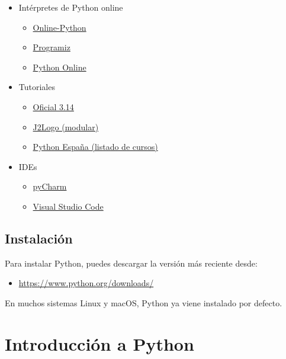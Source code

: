 \documentclass[
]{book}
\providecommand{\tightlist}{%
  \setlength{\itemsep}{0pt}\setlength{\parskip}{0pt}}
\theoremstyle{break}
\theoremstyle{nonumberplain}
\begin{document}
\begin{itemize}
\tightlist
\item
  Intérpretes de Python online

  \begin{itemize}
  \tightlist
  \item
    \href{https://www.online-python.com/}{Online-Python}
  \item
    \href{https://www.programiz.com/python-programming/online-compiler/}{Programiz}
  \item
    \href{https://pythononline.net/}{Python Online}
  \end{itemize}
\item
  Tutoriales

  \begin{itemize}
  \tightlist
  \item
    \href{https://docs.python.org/es/3/tutorial/}{Oficial 3.14}
  \item
    \href{https://j2logo.com/python/tutorial/}{J2Logo (modular)}
  \item
    \href{https://es.python.org/aprende-python/}{Python España (listado de cursos)}
  \end{itemize}
\item
  IDEs

  \begin{itemize}
  \tightlist
  \item
    \href{https://www.jetbrains.com/es-es/pycharm/download}{pyCharm}
  \item
    \href{https://code.visualstudio.com/}{Visual Studio Code}
  \end{itemize}
\end{itemize}

\subsection{Instalación}\label{instalaciuxf3n}

Para instalar Python, puedes descargar la versión más reciente desde:

\begin{itemize}
\tightlist
\item
  \url{https://www.python.org/downloads/}
\end{itemize}

En muchos sistemas Linux y macOS, Python ya viene instalado por defecto.

\section{Introducción a Python}\label{introducciuxf3n-a-python}
\end{document}
